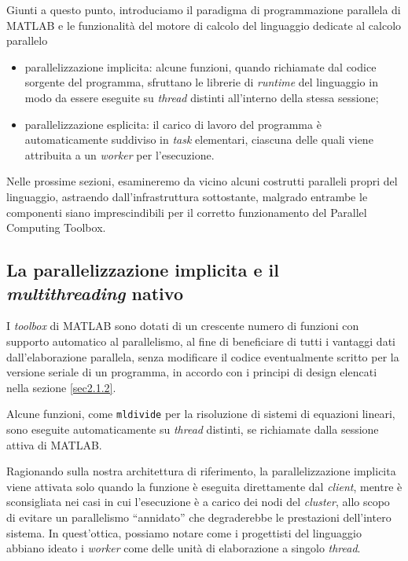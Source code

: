 Giunti a questo punto, introduciamo il paradigma di programmazione parallela di MATLAB e le funzionalit\`a del motore di calcolo del linguaggio dedicate al calcolo parallelo
\begin{itemize}
    \item parallelizzazione implicita: alcune funzioni, quando richiamate dal codice sorgente del programma, sfruttano le librerie di \textit{runtime} del linguaggio
          in modo da essere eseguite su \textit{thread} distinti all'interno della stessa sessione;
    \item parallelizzazione esplicita: il carico di lavoro del programma \`e automaticamente suddiviso in \textit{task} elementari, ciascuna delle quali viene
          attribuita a un \textit{worker} per l'esecuzione.
\end{itemize}

Nelle prossime sezioni, esamineremo da vicino alcuni costrutti paralleli propri del linguaggio, astraendo dall'infrastruttura sottostante, malgrado entrambe le componenti
siano imprescindibili per il corretto funzionamento del Parallel Computing Toolbox.

\subsection{La parallelizzazione implicita e il \textit{multithreading} nativo}
I \textit{toolbox} di MATLAB sono dotati di un crescente numero di funzioni con supporto automatico al parallelismo, al fine di beneficiare di tutti
i vantaggi dati dall'elaborazione parallela, senza modificare il codice eventualmente scritto per la versione seriale di un programma, in accordo con i principi di design elencati
nella sezione \ref{sec2.1.2}.

Alcune funzioni, come \lstinline{mldivide} per la risoluzione di sistemi di equazioni lineari, sono eseguite automaticamente su \textit{thread}
distinti, se richiamate dalla sessione attiva di MATLAB.

Ragionando sulla nostra architettura di riferimento, la parallelizzazione implicita viene attivata solo quando la funzione \`e eseguita direttamente dal \textit{client},
mentre \`e sconsigliata nei casi in cui l'esecuzione \`e a carico dei nodi del \textit{cluster}, allo scopo di evitare un parallelismo \enquote{annidato} che degraderebbe le prestazioni
dell'intero sistema. \newline
In quest'ottica, possiamo notare come i progettisti del linguaggio abbiano ideato i \textit{worker} come delle unit\`a di elaborazione a singolo \textit{thread}.


